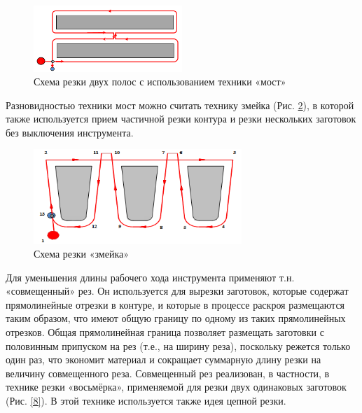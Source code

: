 \documentclass[12pt,twoside]{report}
\begin{document}
\begin{figure}
  \begin{center}
  \includegraphics[width=0.5\textwidth]{bridge.png}
  \caption{Схема резки двух полос с использованием техники «мост»}
  \label{bridge}
  \end{center}
\end{figure}

Разновидностью техники мост можно считать технику змейка
(Рис. \ref{snake}),
в которой также используется прием
частичной резки контура и резки
нескольких заготовок без выключения инструмента.

\begin{figure}
  \begin{center}
  \includegraphics[width=0.7\textwidth]{snake.png}
  \caption{Схема резки «змейка»}
  \label{snake}
  \end{center}
\end{figure}

Для уменьшения длины рабочего хода инструмента
применяют т.н. «совмещенный» рез.
Он используется для вырезки заготовок,
которые содержат прямолинейные отрезки в контуре,
и которые в процессе раскроя размещаются таким образом,
что имеют общую границу по одному из таких прямолинейных отрезков.
Общая прямолинейная граница позволяет размещать
заготовки с половинным припуском на рез
(т.е., на ширину реза),
поскольку режется только один раз,
что экономит материал и сокращает суммарную
длину резки на величину совмещенного реза.
Совмещенный рез реализован, в частности,
в технике резки «восьмёрка»,
применяемой для резки двух одинаковых заготовок
(Рис. \ref{8}).
В этой технике используется также идея цепной резки.
\end{document}

